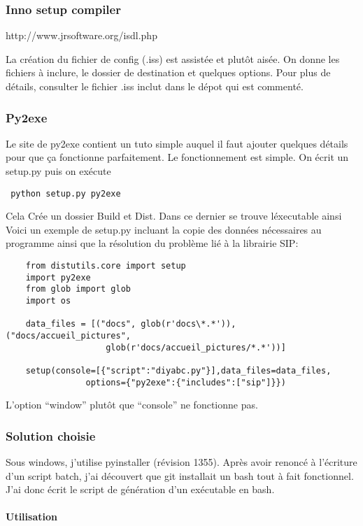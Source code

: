 \documentclass[12pt,a4paper]{article}
\begin{document}
        \subsubsection{Inno setup compiler}
        http://www.jrsoftware.org/isdl.php

        La cr\'eation du fichier de config (.iss) est assist\'ee et plutôt
        ais\'ee. On donne les fichiers à inclure, le dossier de destination et
        quelques options. Pour plus de d\'etails, consulter le fichier .iss
        inclut dans le d\'epot qui est comment\'e.

        \subsubsection{Py2exe}
        Le site de py2exe contient un tuto simple auquel il faut ajouter
        quelques d\'etails pour que ça fonctionne parfaitement. Le
        fonctionnement est simple. On \'ecrit un setup.py puis on ex\'ecute
        \begin{verbatim} python setup.py py2exe \end{verbatim} Cela Cr\'ee un
        dossier Build et Dist. Dans ce dernier se trouve l\'executable ainsi
        Voici un exemple de setup.py incluant la copie des donn\'ees
        n\'ecessaires au programme ainsi que la r\'esolution du problème li\'e à
        la librairie SIP:
        \begin{verbatim}
    from distutils.core import setup
    import py2exe
    from glob import glob
    import os

    data_files = [("docs", glob(r'docs\*.*')),("docs/accueil_pictures",
                    glob(r'docs/accueil_pictures/*.*'))]

    setup(console=[{"script":"diyabc.py"}],data_files=data_files, 
                options={"py2exe":{"includes":["sip"]}})
        \end{verbatim}
        L'option ``window'' plutôt que ``console'' ne fonctionne pas.
        \subsubsection{Solution choisie}
        Sous windows, j'utilise pyinstaller (révision 1355). Après avoir renoncé
        à l'écriture d'un script batch, j'ai découvert que git installait un
        bash tout à fait fonctionnel. J'ai donc écrit le script de génération
        d'un exécutable en bash.
        \paragraph{Utilisation}
\end{document}

